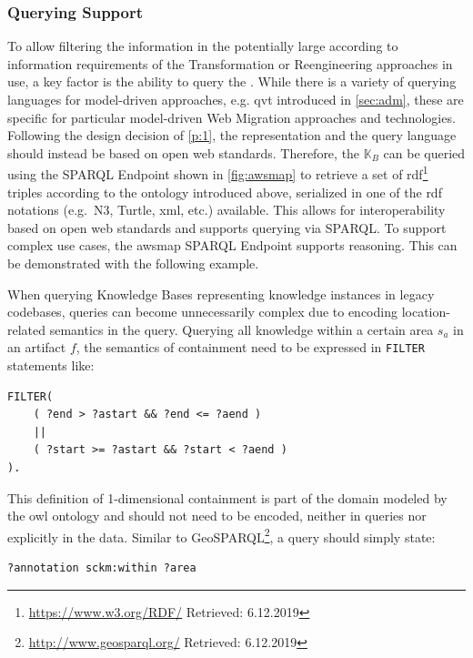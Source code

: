 \subsubsection*{Querying Support}
To allow filtering the information in the potentially large \awsmknowledgebase according to information requirements of the \gls{Transformation} or \gls{Reengineering} approaches in use, a key factor is the ability to query the \knowledgebase.
While there is a variety of querying languages for model-driven approaches, e.g. \gls{qvt} introduced in \cref{sec:adm}, these are specific for particular model-driven \gls{Web Migration} approaches and technologies.
Following the design decision of \cref{p:1}, the representation and the query language should instead be based on open \gls{web} standards.
Therefore, the \awsmknowledgebase \(\mathbb{K}_{B}\) can be queried using the SPARQL Endpoint shown in \cref{fig:awsmap} to retrieve a set of \gls{rdf}\footnote{\url{https://www.w3.org/RDF/} Retrieved: 6.12.2019} triples according to the ontology introduced above, serialized in one of the \gls{rdf} notations (e.g.~N3, Turtle, \gls{xml}, etc.) available.
This allows for interoperability based on open \gls{web} standards and supports querying via SPARQL.
To support complex use cases, the \gls{awsmap} SPARQL Endpoint supports reasoning.
This can be demonstrated with the following example.

When querying Knowledge Bases representing knowledge instances in legacy codebases, queries can become unnecessarily complex due to encoding location-related semantics in the query.
Querying all knowledge within a certain area \(s_a\) in an \gls{artifact} \(f\), the semantics of containment need to be expressed in \texttt{FILTER} statements like:

\begin{lstlisting}[language=sparql, captionpos=t, caption=Partial SPARQL Containment Query]
FILTER(
	( ?end > ?astart && ?end <= ?aend ) 
	|| 
	( ?start >= ?astart && ?start < ?aend )
).
\end{lstlisting}

\vspace{-15pt}
This definition of 1-dimensional containment is part of the domain modeled by the \gls{owl} ontology and should not need to be encoded, neither in queries nor explicitly in the data.
Similar to GeoSPARQL\footnote{\url{http://www.geosparql.org/} Retrieved: 6.12.2019}, a query should simply state:

\begin{lstlisting}[language=sparql, captionpos=t, caption={[Partial SPARQL Containment Query using sckm:within]Partial SPARQL Containment Query using sckm:within Property}]
?annotation sckm:within ?area
\end{lstlisting}

